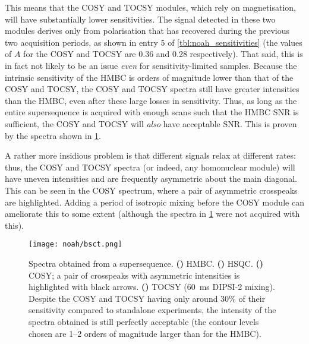 This means that the COSY and TOCSY modules, which rely on  magnetisation, will have substantially lower sensitivities.
The signal detected in these two modules derives only from polarisation that has recovered during the previous two acquisition periods, as shown in entry 5 of \cref{tbl:noah_sensitivities} (the values of $A$ for the COSY and TOCSY are 0.36 and 0.28 respectively).
That said, this is in fact not likely to be an issue \textit{even} for sensitivity-limited samples.
Because the intrinsic sensitivity of the HMBC is orders of magnitude lower than that of the COSY and TOCSY, the COSY and TOCSY spectra still have greater intensities than the HMBC, even after these large losses in sensitivity.
Thus, as long as the entire supersequence is acquired with enough scans such that the HMBC SNR is sufficient, the COSY and TOCSY will \textit{also} have acceptable SNR.
This is proven by the spectra shown in \cref{fig:bsct}.

A rather more insidious problem is that different signals relax at different rates: thus, the COSY and TOCSY spectra (or indeed, any homonuclear module) will have uneven intensities and are frequently asymmetric about the main diagonal.
This can be seen in the COSY spectrum, where a pair of asymmetric crosspeaks are highlighted.
Adding a period of isotropic mixing before the COSY module\autocite{Kupce2018CC} can ameliorate this to some extent (although the spectra in \cref{fig:bsct} were not acquired with this).

\begin{figure}[!ht]
    \centering
    \texttt{[image: noah/bsct.png]}%
    {\label{fig:bsct_b}}%
    {\label{fig:bsct_s}}%
    {\label{fig:bsct_c}}%
    {\label{fig:bsct_t}}%
    \caption[Spectra obtained from a  supersequence.]{
        Spectra obtained from a  supersequence. 
        \textbf{()} HMBC.
        \textbf{()} HSQC.
        \textbf{()} COSY; a pair of crosspeaks with asymmetric intensities is highlighted with black arrows.
        \textbf{()} TOCSY (\qty{60}{\ms} DIPSI-2 mixing).
        Despite the COSY and TOCSY having only around 30\% of their sensitivity compared to standalone experiments, the intensity of the spectra obtained is still perfectly acceptable (the contour levels chosen are 1--2 orders of magnitude larger than for the HMBC).
    }
    \label{fig:bsct}
\end{figure}


